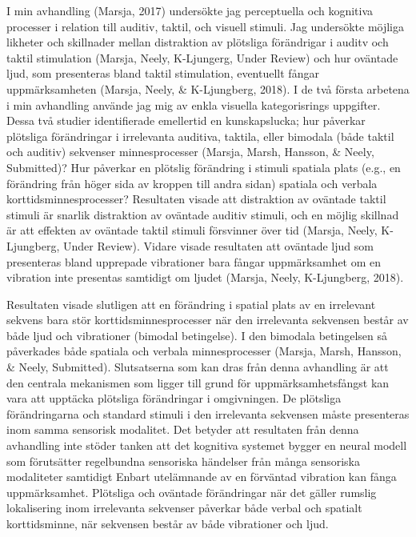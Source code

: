 \documentclass[]{article}
\begin{document}
I min avhandling (Marsja, 2017) undersökte jag perceptuella och
kognitiva processer i relation till auditiv, taktil, och visuell
stimuli. Jag undersökte möjliga likheter och skillnader mellan
distraktion av plötsliga förändrigar i auditv och taktil stimulation
(Marsja, Neely, K-Ljungerg, Under Review) och hur oväntade ljud, som
presenteras bland taktil stimulation, eventuellt fångar uppmärksamheten
(Marsja, Neely, \& K-Ljungberg, 2018). I de två första arbetena i min
avhandling använde jag mig av enkla visuella kategorisrings uppgifter.
Dessa två studier identifierade emellertid en kunskapslucka; hur
påverkar plötsliga förändringar i irrelevanta auditiva, taktila, eller
bimodala (både taktil och auditiv) sekvenser minnesprocesser (Marsja,
Marsh, Hansson, \& Neely, Submitted)? Hur påverkar en plötslig
förändring i stimuli spatiala plats (e.g., en förändring från höger sida
av kroppen till andra sidan) spatiala och verbala
korttidsminnesprocesser? Resultaten visade att distraktion av oväntade
taktil stimuli är snarlik distraktion av oväntade auditiv stimuli, och
en möjlig skillnad är att effekten av oväntade taktil stimuli försvinner
över tid (Marsja, Neely, K-Ljungberg, Under Review). Vidare visade
resultaten att oväntade ljud som presenteras bland upprepade vibrationer
bara fångar uppmärksamhet om en vibration inte presentas samtidigt om
ljudet (Marsja, Neely, K-Ljungberg, 2018).

Resultaten visade slutligen att en förändring i spatial plats av en
irrelevant sekvens bara stör korttidsminnesprocesser när den irrelevanta
sekvensen består av både ljud och vibrationer (bimodal betingelse). I
den bimodala betingelsen så påverkades både spatiala och verbala
minnesprocesser (Marsja, Marsh, Hansson, \& Neely, Submitted).
Slutsatserna som kan dras från denna avhandling är att den centrala
mekanismen som ligger till grund för uppmärksamhetsfångst kan vara att
upptäcka plötsliga förändringar i omgivningen. De plötsliga
förändringarna och standard stimuli i den irrelevanta sekvensen måste
presenteras inom samma sensorisk modalitet. Det betyder att resultaten
från denna avhandling inte stöder tanken att det kognitiva systemet
bygger en neural modell som förutsätter regelbundna sensoriska händelser
från många sensoriska modaliteter samtidigt Enbart utelämnande av en
förväntad vibration kan fånga uppmärksamhet. Plötsliga och oväntade
förändringar när det gäller rumslig lokalisering inom irrelevanta
sekvenser påverkar både verbal och spatialt korttidsminne, när sekvensen
består av både vibrationer och ljud.
\end{document}
